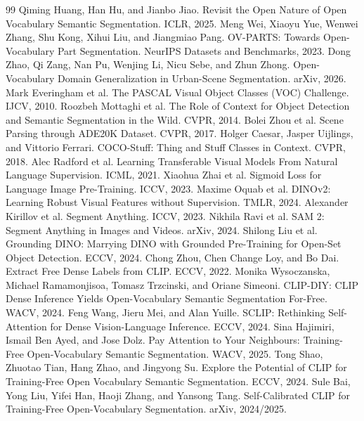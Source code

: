 \documentclass[11pt,a4paper]{article}
\begin{document}
\clearpage
\begin{thebibliography}{99}
\small
{} Qiming Huang, Han Hu, and Jianbo Jiao. Revisit the Open Nature of Open Vocabulary Semantic Segmentation. ICLR, 2025.
 Meng Wei, Xiaoyu Yue, Wenwei Zhang, Shu Kong, Xihui Liu, and Jiangmiao Pang. OV-PARTS: Towards Open-Vocabulary Part Segmentation. NeurIPS Datasets and Benchmarks, 2023.
 Dong Zhao, Qi Zang, Nan Pu, Wenjing Li, Nicu Sebe, and Zhun Zhong. Open-Vocabulary Domain Generalization in Urban-Scene Segmentation. arXiv, 2026.
 Mark Everingham et al. The PASCAL Visual Object Classes (VOC) Challenge. IJCV, 2010.
 Roozbeh Mottaghi et al. The Role of Context for Object Detection and Semantic Segmentation in the Wild. CVPR, 2014.
 Bolei Zhou et al. Scene Parsing through ADE20K Dataset. CVPR, 2017.
 Holger Caesar, Jasper Uijlings, and Vittorio Ferrari. COCO-Stuff: Thing and Stuff Classes in Context. CVPR, 2018.
 Alec Radford et al. Learning Transferable Visual Models From Natural Language Supervision. ICML, 2021.
 Xiaohua Zhai et al. Sigmoid Loss for Language Image Pre-Training. ICCV, 2023.
 Maxime Oquab et al. DINOv2: Learning Robust Visual Features without Supervision. TMLR, 2024.
 Alexander Kirillov et al. Segment Anything. ICCV, 2023.
 Nikhila Ravi et al. SAM 2: Segment Anything in Images and Videos. arXiv, 2024.
 Shilong Liu et al. Grounding DINO: Marrying DINO with Grounded Pre-Training for Open-Set Object Detection. ECCV, 2024.
 Chong Zhou, Chen Change Loy, and Bo Dai. Extract Free Dense Labels from CLIP. ECCV, 2022.
 Monika Wysoczanska, Michael Ramamonjisoa, Tomasz Trzcinski, and Oriane Simeoni. CLIP-DIY: CLIP Dense Inference Yields Open-Vocabulary Semantic Segmentation For-Free. WACV, 2024.
 Feng Wang, Jieru Mei, and Alan Yuille. SCLIP: Rethinking Self-Attention for Dense Vision-Language Inference. ECCV, 2024.
 Sina Hajimiri, Ismail Ben Ayed, and Jose Dolz. Pay Attention to Your Neighbours: Training-Free Open-Vocabulary Semantic Segmentation. WACV, 2025.
 Tong Shao, Zhuotao Tian, Hang Zhao, and Jingyong Su. Explore the Potential of CLIP for Training-Free Open Vocabulary Semantic Segmentation. ECCV, 2024.
 Sule Bai, Yong Liu, Yifei Han, Haoji Zhang, and Yansong Tang. Self-Calibrated CLIP for Training-Free Open-Vocabulary Segmentation. arXiv, 2024/2025.

\end{thebibliography}
\end{document}
